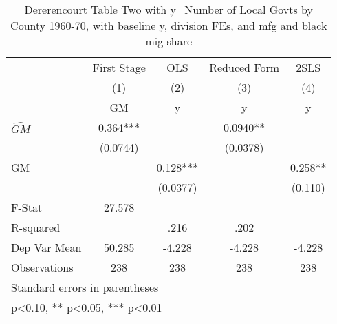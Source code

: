 \begin{table}[htbp]\centering
\def\sym#1{\ifmmode^{#1}\else\(^{#1}\)\fi}
\caption{Dererencourt Table Two with y=Number of Local Govts by County 1960-70, with baseline y, division FEs, and mfg and black mig share}
\begin{tabular}{l*{4}{c}}
\toprule
                    & First Stage   &         OLS   &Reduced Form   &        2SLS   \\
                    &\multicolumn{1}{c}{(1)}&\multicolumn{1}{c}{(2)}&\multicolumn{1}{c}{(3)}&\multicolumn{1}{c}{(4)}\\
                    &\multicolumn{1}{c}{GM}&\multicolumn{1}{c}{y}&\multicolumn{1}{c}{y}&\multicolumn{1}{c}{y}\\
\midrule
$\hat{GM}$          &       0.364***&               &      0.0940** &               \\
                    &    (0.0744)   &               &    (0.0378)   &               \\
\addlinespace
GM                  &               &       0.128***&               &       0.258** \\
                    &               &    (0.0377)   &               &     (0.110)   \\
\midrule
F-Stat              &      27.578   &               &               &               \\
R-squared           &               &        .216   &        .202   &               \\
Dep Var Mean        &      50.285   &      -4.228   &      -4.228   &      -4.228   \\
Observations        &         238   &         238   &         238   &         238   \\
\bottomrule
\multicolumn{5}{l}{\footnotesize Standard errors in parentheses}\\
\multicolumn{5}{l}{\footnotesize * p<0.10, ** p<0.05, *** p<0.01}\\
\end{tabular}
\end{table}
